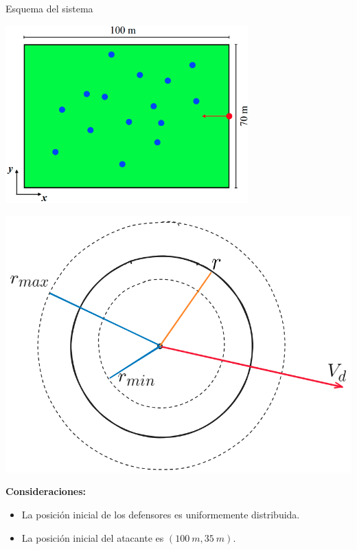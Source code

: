 \begin{frame}{Esquema del sistema}
    \begin{center}
        \begin{minipage}{0.55\textwidth}
            \includegraphics[width=0.7\textwidth]{pic/04-simulaciones/esquema-field}
        \end{minipage}
        \hfill
        \begin{minipage}{0.4\textwidth}
            \includegraphics[width=\textwidth]{pic/04-simulaciones/esquema-particula}
        \end{minipage}
    \end{center}

    \footnotesize{
        \textbf{Consideraciones:}
        \begin{itemize}
            \item La posición inicial de los defensores es uniformemente distribuida.
            \item La posición inicial del atacante es $(100\ m, 35\ m)$.
        \end{itemize}
    }
\end{frame}


